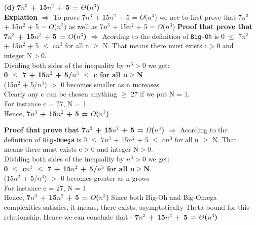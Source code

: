 \documentclass[12pt]{article}
\renewcommand\part[1]{\vspace{.10in}\textbf{(#1)}}
\begin{document}
\part{d} \textbf{7$n^3$ + 15$n^2$ + 5 = $\Theta$($n^3$)}
\\
\textbf{Explation $\Rightarrow$} To prove 7$n^3$ + 15$n^2$ + 5 = $\Theta$($n^3$) we nee to first prove that 7$n^3$ + 15$n^2$ + 5 = $O$($n^3$) as well as 7$n^3$ + 15$n^2$ + 5 = $\Omega$($n^3$)
\newline
\textbf{Proof that prove that 7$n^3$ + 15$n^2$ + 5 = $O$($n^3$) $\Rightarrow$}
\newline
Acording to the definition of \texttt{Big-Oh} is 0 $\leq$ 7$n^3$ + 15$n^2$ + 5 $\leq$ c$n^3$ for all n $\geq$ N.
\newline
That means there must exists c$>$0	and	integer	N$>$0.
\\Dividing both sides of the inequality by	$n^3$$>$0 we get:
\\ \hspace{3cm}\textbf{0 $\leq$ 7 + 15$n^2$ + 5/$n^3$ $\leq$ c for all n$\geq$N}
\\(15$n^2$ + 5/$n^3$)	$>$ 0 becomes smaller as n increases
\\
Clearly any c can be chosen anything $\geq$ 27 if we put N = 1. 
\\ For instance c = 27, N = 1
\\Hence, \textbf{7$n^3$ + 15$n^2$ + 5 = $O$($n^3$)}

\textbf{Proof that prove that 7$n^3$ + 15$n^2$ + 5 = $\Omega$($n^3$) $\Rightarrow$}
\newline
Acording to the definition of \texttt{Big-Omega} is 0 $\leq$ 7$n^3$ + 15$n^2$ + 5 $\leq$ c$n^3$ for all n $\geq$ N.
\newline
That means there must exists c$>$0	and	integer	N$>$0.
\\Dividing both sides of the inequality by	$n^3$$>$0 we get:
\\ \hspace{3cm}\textbf{0 $\leq$ c$n^3$ $\leq$ 7 + 15$n^2$ + 5/$n^3$ for all n$\geq$N}
\\(15$n^2$ + 5/$n^3$)	$>$ 0 becomes greater as n grows 
\\ For instance c = 27, N = 1
\\Hence, \textbf{7$n^3$ + 15$n^2$ + 5 = $O$($n^3$)}
\newline 
Since both Big-Oh and Big-Omega complexities satisfies, it means, there exists, asymptotically Theta bound for this relationship. Hence we can conclude that - \textbf{7$n^3$ + 15$n^2$ + 5 = $\Theta$($n^3$)}
\end{document}
